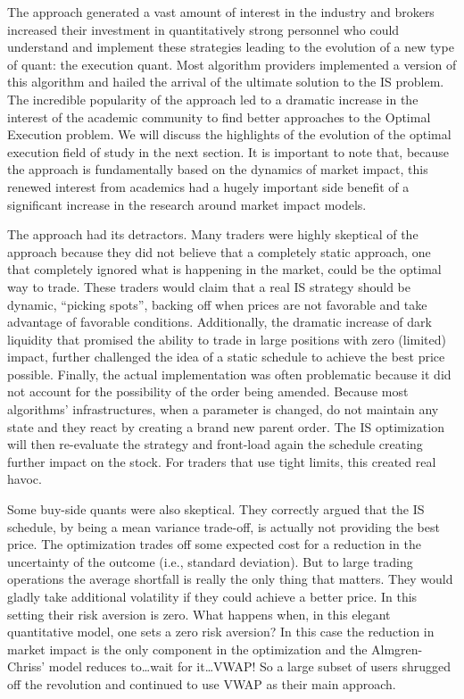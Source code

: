 The approach generated a vast amount of interest in the industry and brokers increased their investment in quantitatively strong personnel who could understand and implement these strategies leading to the evolution of a new type of quant: the execution quant. Most algorithm providers implemented a version of this algorithm and hailed the arrival of the ultimate solution to the IS problem. The incredible popularity of the approach led to a dramatic increase in the interest of the academic community to find better approaches to the Optimal Execution problem. We will discuss the highlights of the evolution of the optimal execution field of study in the next section. It is important to note that, because the approach is fundamentally based on the dynamics of market impact, this renewed interest from academics had  a hugely important side benefit of a significant increase in the research around market impact models. 


The approach had its detractors. Many traders were highly skeptical of the approach because they did not believe that a completely static approach, one that completely ignored what is happening in the market, could be the optimal way to trade. These traders would claim that a real IS strategy should be dynamic, ``picking spots'', backing off when prices are not favorable and take advantage of favorable conditions.  Additionally, the dramatic increase of dark liquidity that promised the ability to trade in large positions with zero (limited) impact, further challenged the idea of a static schedule to achieve the best price possible. Finally, the actual implementation was often problematic because it did not account for the possibility of the order being amended. Because most algorithms' infrastructures, when a parameter is changed, do not maintain any state and they react by creating a brand new parent order. The IS optimization will then re-evaluate the strategy and front-load again the schedule creating further impact on the stock. For traders that use tight limits, this created real havoc.


Some buy-side quants were also skeptical. They correctly argued that the IS schedule, by being a mean variance trade-off, is actually not providing the best price. The optimization trades off some expected cost for a reduction in the uncertainty of the outcome (i.e., standard deviation). But to large trading operations the average shortfall is really the only thing that matters. They would gladly take additional volatility if they could achieve a better price. In this setting their risk aversion is zero. What happens when, in this elegant quantitative model, one sets a zero risk aversion? In this case the reduction in market impact is the only component in the optimization and the Almgren-Chriss' model reduces to\dots  wait for it\dots VWAP! So a large subset of users shrugged off the revolution and continued to use VWAP as their main approach.


